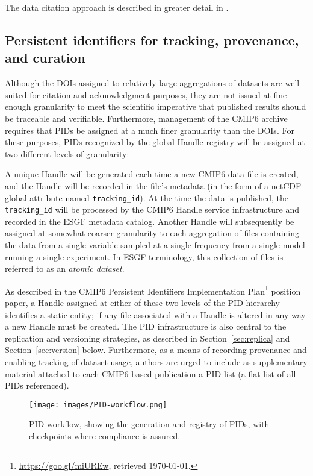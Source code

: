 \documentclass[gmd,manuscript]{copernicus}
\newcommand{\pllabel}[1]{\label{p-#1}\linelabel{l-#1}}
\newcommand{\urlref}[2] {\href{#1}{#2}\footnote{\url{#1}, retrieved \today.}}
\begin{document}
The data citation approach is described in greater detail in \cite{ref:stockhauselautenschlager2017}.

\subsection{Persistent identifiers for tracking, provenance, and
  curation}
\label{sec:pid}

Although the DOIs assigned to relatively large aggregations of
datasets are well suited for citation and acknowledgment purposes,
they are not issued at fine enough granularity to meet the scientific
imperative that published results should be traceable and verifiable.
Furthermore, management of the CMIP6 archive requires that PIDs be
assigned at a much finer granularity than the DOIs. For these
purposes, PIDs recognized by the global Handle registry will be
assigned at two different levels of granularity:

A unique Handle will be generated each time a new CMIP6 data file is
created, and the Handle will be recorded in the file's metadata (in
the form of a netCDF global attribute named \texttt{tracking\_id}). At
the time the data is published, the \texttt{tracking\_id} will be
processed by the CMIP6 Handle service infrastructure and recorded in
the ESGF metadata catalog. Another Handle will subsequently be
assigned at somewhat coarser granularity to each aggregation of files
containing the data from a single variable sampled at a single
frequency
\pllabel{RC1-45}
from a single model running a single experiment. In ESGF terminology,
this collection of files is referred to as an \emph{atomic dataset}.

As described in the \urlref{https://goo.gl/miUREw}{CMIP6 Persistent
  Identifiers Implementation Plan} position paper, a Handle assigned
at either of these two levels of the PID hierarchy identifies a static
entity; if any file associated with a Handle is altered in any way a
new Handle must be created. The PID infrastructure is also central to
the replication and versioning strategies, as described in
Section~\ref{sec:replica} and Section~\ref{sec:version} below.
Furthermore, as a means of recording provenance and enabling tracking
of dataset usage, authors are urged to include as supplementary
material attached to each CMIP6-based publication a PID list (a flat
list of all PIDs referenced).

\begin{figure*}
  \begin{center}
    \texttt{[image: images/PID-workflow.png]}
  \end{center}
  \caption{PID workflow, showing the generation and registry of PIDs,
    with checkpoints where compliance is assured.}
  \label{fig:pidflow}
\end{figure*}
\end{document}
